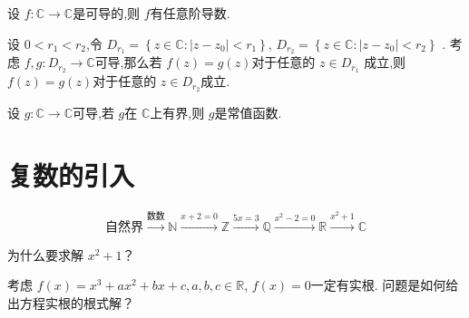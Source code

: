 \documentclass[../../复变函数.tex]{subfiles}
\begin{document}
\hspace*{\fill} 

\begin{example}
    设 \(  f: \mathbb{C} \to \mathbb{C}   \)是可导的,则 \(  f  \)有任意阶导数.  
\end{example}

\hspace*{\fill} 

\begin{example}
    设 \(  0<r_1<r_2  \),令 \(  D_{r_1}=  \left\{ z \in \mathbb{C} : \left| z-z_0 \right|<r_1  \right\}  \), \(  D_{r_2}=  \left\{ z \in \mathbb{C} : \left| z-z_0 \right|<r_2  \right\}  \) .
    考虑 \(  f,g: D_{r_2}\to \mathbb{C}   \)可导,那么若 \(  f\left( z \right)= g\left( z \right)    \)对于任意的 \(  z \in D_{r_1}  \)  成立,则 \(  f\left( z \right)= g\left( z \right)    \)对于任意的 \(  z \in D_{r_2}  \)成立.  
\end{example}

\hspace*{\fill} 

\begin{example}[ (Liouville)]
设 \(  g:\mathbb{C} \to \mathbb{C}   \)可导,若 \(  g  \)在 \(  \mathbb{C}   \)上有界,则 \(  g  \)是常值函数.    
\end{example}

\hspace*{\fill} 

\section{复数的引入}

\[
\text{自然界}\xrightarrow{\text{数数}} \mathbb{N} \xrightarrow{x + 2= 0} \mathbb{Z}  \xrightarrow{5x= 3} \mathbb{Q}  
\xrightarrow{x^{2}-2= 0} \mathbb{R} \xrightarrow{x^{2}+ 1}\mathbb{C} 
\]

\noindent 为什么要求解 \(  x^{2}+ 1  \)？ 


\begin{example}
    考虑 \(  f\left( x \right)= x^{3}+ ax^{2}+ bx+ c,a,b,c \in \mathbb{R}    \), \(  f\left( x \right)= 0   \)一定有实根.
    问题是如何给出方程实根的根式解？  
\end{example}
\end{document}
